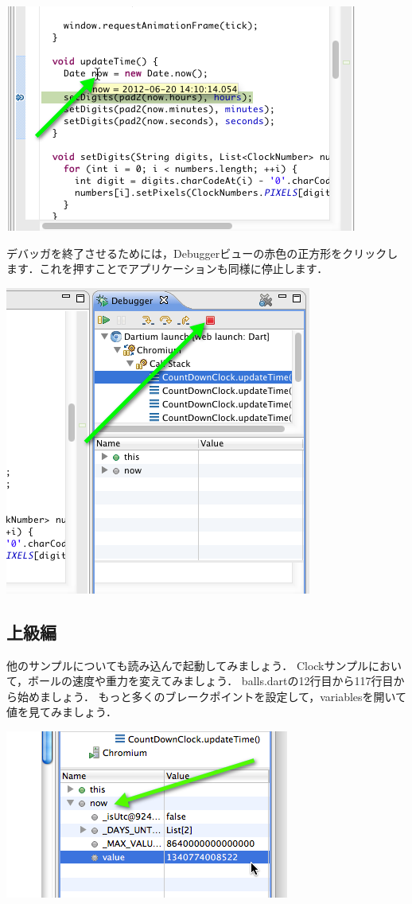 \includegraphics{step1/debug_img3.png}

デバッガを終了させるためには，Debuggerビューの赤色の正方形をクリックします．これを押すことでアプリケーションも同様に停止します．

\includegraphics{step1/debug_img4.png}

\subsection{上級編}

他のサンプルについても読み込んで起動してみましょう．
Clockサンプルにおいて，ボールの速度や重力を変えてみましょう．
balls.dartの12行目から117行目から始めましょう．
もっと多くのブレークポイントを設定して，variablesを開いて値を見てみましょう．

\includegraphics{step1/advanced.png}
